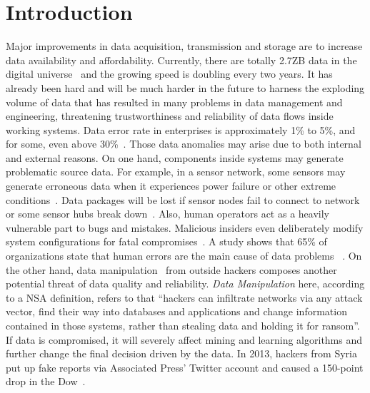 \documentclass[10pt,conference,letterpaper]{IEEEtran}
\begin{document}
	\section{Introduction}
		Major improvements in data acquisition, transmission and storage are to increase data availability and affordability. Currently, there are totally 2.7ZB data in the digital universe~\cite{bigDataStatistics} and the growing speed is doubling every two years.
		It has already been hard and will be much harder in the future to harness the exploding volume of data that has resulted in many problems in data management and engineering, threatening trustworthiness and reliability of data flows inside working systems.
	Data error rate in enterprises is approximately 1\% to 5\%, and for some, even above 30\%~\cite{saha2014data}. Those data anomalies may arise due to both internal and external reasons. On one hand, components inside systems may generate problematic source data. For example, in a sensor network, some sensors may generate erroneous data when it experiences power failure or other extreme conditions~\cite{rassam2014adaptive}. Data packages will be lost if sensor nodes fail to connect to network or some sensor hubs break down~\cite{herodotou2014scalable}. Also, human operators act as a heavily vulnerable part to bugs and mistakes. Malicious insiders even deliberately modify system configurations for fatal compromises~\cite{schuster2015vc3}. A study shows that 65\% of organizations state that human errors are the main  cause of data problems~\cite{humanError} .
		On the other hand, data manipulation~\cite{dataManipulation} from outside hackers composes another potential threat of data quality and reliability. \textit{Data Manipulation} here, according to a NSA definition, refers to that ``hackers can infiltrate networks via any attack vector, find their way into databases and applications and change information contained in those systems, rather than stealing data and holding it for ransom''.
		If data is compromised, it will severely affect mining and learning algorithms and further change the final decision driven by the data. In 2013, hackers from Syria put up fake reports via Associated Press' Twitter account and caused a 150-point drop in the Dow~\cite{SyriaHacker}.
		
\end{document}
